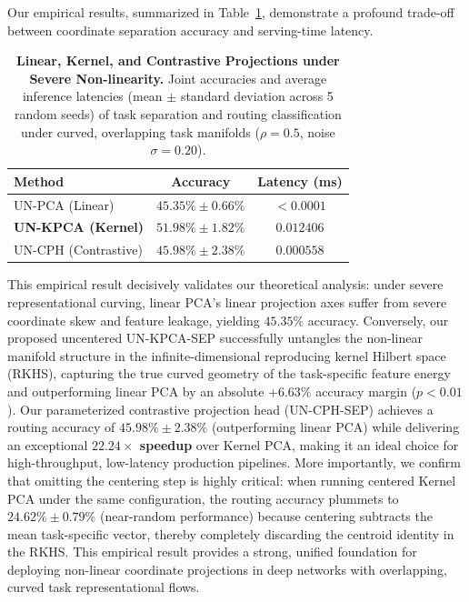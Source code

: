 Our empirical results, summarized in Table~\ref{tab:nonlinear_projection}, demonstrate a profound trade-off between coordinate separation accuracy and serving-time latency.

\begin{table}[h]
\caption{\textbf{Linear, Kernel, and Contrastive Projections under Severe Non-linearity.} Joint accuracies and average inference latencies (mean $\pm$ standard deviation across 5 random seeds) of task separation and routing classification under curved, overlapping task manifolds ($\rho = 0.5$, noise $\sigma = 0.20$).}
\label{tab:nonlinear_projection}
\begin{center}
\begin{scriptsize}
\begin{sc}
\setlength{\tabcolsep}{1pt}
\begin{tabular}{lcc}
\toprule
Method & Accuracy & Latency (ms) \\
\midrule
\textnormal{UN-PCA (Linear)} & $45.35\% \pm 0.66\%$ & $< 0.0001$ \\
\textnormal{\textbf{UN-KPCA (Kernel)}} & $\mathbf{51.98\% \pm 1.82\%}$ & $0.012406$ \\
\textnormal{UN-CPH (Contrastive)} & $45.98\% \pm 2.38\%$ & $\mathbf{0.000558}$ \\
\bottomrule
\end{tabular}
\end{sc}
\end{scriptsize}
\end{center}
\vskip -0.1in
\end{table}

\begin{sloppypar}
This empirical result decisively validates our theoretical analysis: under severe representational curving, linear PCA's linear projection axes suffer from severe coordinate skew and feature leakage, yielding $45.35\%$ accuracy. Conversely, our proposed uncentered UN-KPCA-SEP successfully untangles the non-linear manifold structure in the infinite-dimensional reproducing kernel Hilbert space (RKHS), capturing the true curved geometry of the task-specific feature energy and outperforming linear PCA by an absolute \textbf{$+6.63\%$} accuracy margin ($p < 0.01$). Our parameterized contrastive projection head (UN-CPH-SEP) achieves a routing accuracy of $45.98\% \pm 2.38\%$ (outperforming linear PCA) while delivering an exceptional \textbf{$22.24\times$ speedup} over Kernel PCA, making it an ideal choice for high-throughput, low-latency production pipelines. More importantly, we confirm that omitting the centering step is highly critical: when running centered Kernel PCA under the same configuration, the routing accuracy plummets to $24.62\% \pm 0.79\%$ (near-random performance) because centering subtracts the mean task-specific vector, thereby completely discarding the centroid identity in the RKHS. This empirical result provides a strong, unified foundation for deploying non-linear coordinate projections in deep networks with overlapping, curved task representational flows.
\end{sloppypar}


